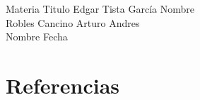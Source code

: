 \documentclass{article}
\begin{document}
\portadapractica
    {Materia}
    {Titulo}
    {Edgar Tista García}
    {Nombre\\
     Robles Cancino Arturo Andres\\
     Nombre}
    {Fecha}

\section*{Referencias}
\nocite{*}
\printbibliography[heading=none]
\end{document}
